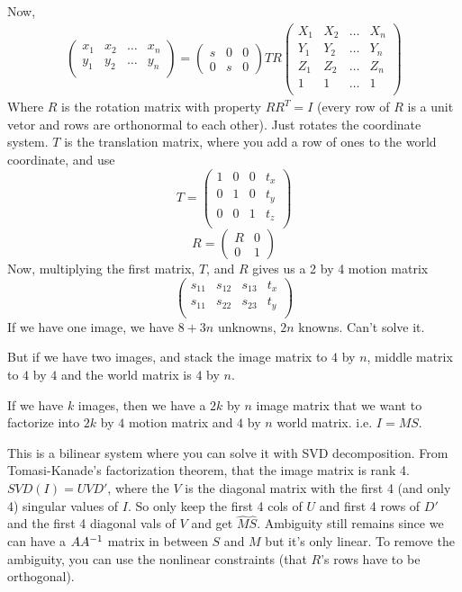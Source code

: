 Now, 
\begin{align*}
\begin{pmatrix}
  x_1 & x_2 & \dots& x_n\\
  y_1& y_2& \dots& y_n\\
\end{pmatrix}
=
\begin{pmatrix}
  s & 0 & 0\\
0 & s & 0
\end{pmatrix} T R
\begin{pmatrix}
  X_1 & X_2 & \dots & X_n\\
  Y_1 & Y_2 & \dots & Y_n\\
  Z_1 & Z_2 & \dots & Z_n\\
 1 &1 & \dots & 1\\
\end{pmatrix}
\end{align*}
Where $R$ is the rotation matrix with property $RR^T=I$ (every row of
$R$ is a unit vetor and rows are orthonormal to each other). Just
rotates the coordinate system. $T$ is the translation matrix, where
you add a row of ones to the world coordinate, and use $$
T =\begin{pmatrix}
  1 & 0 & 0 & t_x\\
  0 & 1 & 0 & t_y\\  0 & 0 & 1 & t_z\\
\end{pmatrix}
$$
$$R =
\begin{pmatrix}
  R & 0\\
0 & 1
\end{pmatrix}
$$
Now, multiplying the first matrix, $T$, and $R$ gives us a 2 by 4
motion matrix
$$
\begin{pmatrix}
s_{11} & s_{12} & s_{13} & t_x\\
s_{11} & s_{22} & s_{23} & t_y\\
\end{pmatrix}
$$
If we have one image, we have $8+3n$ unknowns, $2n$ knowns. Can't
solve it.

But if we have two images, and stack the image matrix to $4$ by $n$,
middle matrix to $4$ by $4$ and the world matrix is $4$ by $n$. 

If we have $k$ images, then we have a $2k$ by $n$ image matrix that we
want to factorize into $2k$ by $4$ motion matrix and $4$ by $n$ world
matrix. i.e. $I = MS$.

This is a bilinear system where you can solve it with SVD decomposition. From
Tomasi-Kanade's factorization theorem, that the image matrix is rank
4. $SVD(I) = U V D'$, where the $V$ is the diagonal matrix with the
first 4 (and only 4) singular values of $I$. So only keep the first 4 cols
of $U$ and first 4 rows of $D'$ and the first 4 diagonal vals of $V$
and get $\hat M \hat S$. Ambiguity still remains since we can have a
$AA^{-1}$ matrix in between $S$ and $M$ but it's only linear. To
remove the ambiguity, you can use the nonlinear constraints (that
$R$'s rows have to be orthogonal). 

